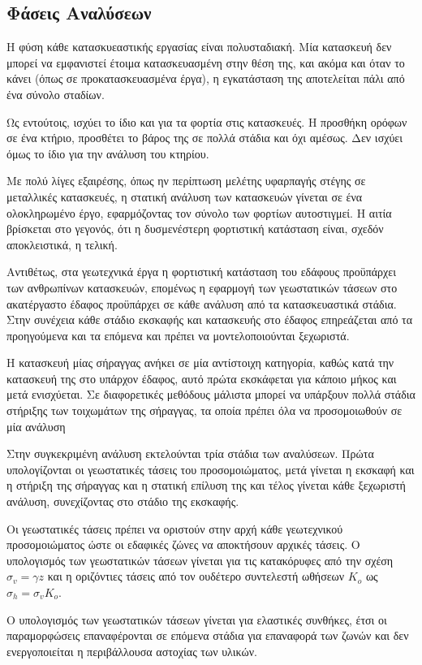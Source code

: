 \subsection{Φάσεις Αναλύσεων}
Η φύση κάθε κατασκυεαστικής εργασίας είναι πολυσταδιακή. Μία κατασκευή δεν μπορεί να εμφανιστεί έτοιμα κατασκευασμένη στην θέση της, και ακόμα και όταν το κάνει (όπως σε προκατασκευασμένα έργα), η εγκατάσταση της αποτελείται πάλι από ένα σύνολο σταδίων.

Ως εντούτοις, ισχύει το ίδιο και για τα φορτία στις κατασκευές. Η προσθήκη ορόφων σε ένα κτήριο, προσθέτει το βάρος της σε πολλά στάδια και όχι αμέσως. Δεν ισχύει όμως το ίδιο για την ανάλυση του κτηρίου.

Με πολύ λίγες εξαιρέσης, όπως ην περίπτωση μελέτης υφαρπαγής στέγης σε μεταλλικές κατασκευές, η στατική ανάλυση των κατασκευών γίνεται σε ένα ολοκληρωμένο έργο, εφαρμόζοντας τον σύνολο των φορτίων αυτοστιγμεί. Η αιτία βρίσκεται στο γεγονός, ότι η δυσμενέστερη φορτιστική κατάσταση είναι, σχεδόν αποκλειστικά, η τελική.

Αντιθέτως, στα γεωτεχνικά έργα η φορτιστική κατάσταση του εδάφους προϋπάρχει των ανθρωπίνων κατασκευών, επομένως η εφαρμογή των γεωστατικών τάσεων στο ακατέργαστο έδαφος προϋπάρχει σε κάθε ανάλυση από τα κατασκευαστικά στάδια. Στην συνέχεια κάθε στάδιο εκσκαφής και κατασκευής στο έδαφος επηρεάζεται από τα προηγούμενα και τα επόμενα και πρέπει να μοντελοποιούνται ξεχωριστά.

Η κατασκευή μίας σήραγγας ανήκει σε μία αντίστοιχη κατηγορία, καθώς κατά την κατασκευή της στο υπάρχον έδαφος, αυτό πρώτα εκσκάφεται για κάποιο μήκος και μετά ενισχύεται. Σε διαφορετικές μεθόδους μάλιστα μπορεί να υπάρξουν πολλά στάδια στήριξης των τοιχωμάτων της σήραγγας, τα οποία πρέπει όλα να προσομοιωθούν σε μία ανάλυση

Στην συγκεκριμένη ανάλυση εκτελούνται τρία στάδια των αναλύσεων. Πρώτα υπολογίζονται οι γεωστατικές τάσεις του προσομοιώματος, μετά γίνεται η εκσκαφή και η στήριξη της σήραγγας και η στατική επίλυση της και τέλος γίνεται κάθε ξεχωριστή ανάλυση, συνεχίζοντας στο στάδιο της εκσκαφής.

Οι γεωστατικές τάσεις πρέπει να οριστούν στην αρχή κάθε γεωτεχνικού προσομοιώματος ώστε οι εδαφικές ζώνες να αποκτήσουν αρχικές τάσεις. Ο υπολογισμός των γεωστατικών τάσεων γίνεται για τις κατακόρυφες από την σχέση $\sigma_v = \gamma z$ και η οριζόντιες τάσεις από τον ουδέτερο συντελεστή ωθήσεων $K_o$ ως $\sigma_h = \sigma_v K_o$.

Ο υπολογισμός των γεωστατικών τάσεων γίνεται για ελαστικές συνθήκες, έτσι οι παραμορφώσεις επαναφέρονται σε επόμενα στάδια για επαναφορά των ζωνών και δεν ενεργοποιείται η περιβάλλουσα αστοχίας των υλικών.


